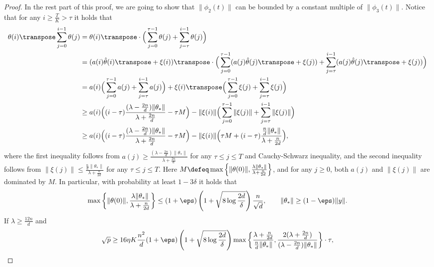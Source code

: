 \begin{proof}
    In the rest part of this proof, we are going to show that $\|\phi_{2}(t)\|$ can be bounded by a constant multiple of $\|\phi_{3}(t)\|$. Notice that for any $i\geq \frac{T}{K} > \tau$ it holds that 
    \begin{align*}
        \theta(i)\transpose\sum_{j=0}^{i-1} \theta(j) & = \theta(i)\transpose \cdot \Big( \sum_{j=0}^{\tau-1} \theta(j) + \sum_{j=\tau}^{i-1} \theta(j) \Big) \\
        & = (a(i)\hat\theta(i)\transpose + \xi(i))\transpose \cdot \Big( \sum_{j=0}^{\tau-1} (a(j)\hat\theta(j)\transpose + \xi(j)) + \sum_{j=\tau}^{i-1} (a(j)\hat\theta(j)\transpose + \xi(j)) \Big) \\
        & = a(i) \Big( \sum_{j=0}^{\tau-1} a(j) + \sum_{j=\tau}^{i-1} a(j) \Big) + \xi(i)\transpose \Big( \sum_{j=0}^{\tau-1} \xi(j) + \sum_{j=\tau}^{i-1} \xi(j) \Big) \\
        & \geq a(i) \Big( (i-\tau) \frac{(\lambda-\frac{2n}{d})\|\theta_*\|}{\lambda + \frac{2n}{d}} - \tau M \Big) - \|\xi(i)\| \Big( \sum_{j=0}^{\tau-1} \|\xi(j)\| + \sum_{j=\tau}^{i-1} \|\xi(j)\| \Big) \\
        & \geq a(i) \Big( (i-\tau) \frac{(\lambda-\frac{2n}{d})\|\theta_*\|}{\lambda + \frac{2n}{d}} - \tau M \Big) - \|\xi(i)\| \Big( \tau M + (i-\tau) \frac{\frac{n}{d}\|\theta_*\|}{\lambda + \frac{n}{2d}} \Big),
    \end{align*}
    where the first inequality follows from $a(j) \geq \frac{(\lambda-\frac{2n}{d})\|\theta_*\|}{\lambda + \frac{2n}{d}}$ for any $\tau\leq j\leq T$ and Cauchy-Schwarz inequality, and the second inequality follows from $\|\xi(j)\|\leq \frac{\frac{n}{d}\|\theta_*\|}{\lambda + \frac{n}{2d}}$ for any $\tau\leq j\leq T$. Here $M \defeq \max\left\{\|\theta(0)\|,\frac{\lambda\|\theta_*\|}{\lambda + \frac{n}{2d}}\right\}$, and for any $j\geq 0$, both $a(j)$ and $\|\xi(j)\|$ are dominated by $M$. In particular, with probability at least $1-3\delta$ it holds that 
    \begin{align*}
        \max\left\{\|\theta(0)\|,\frac{\lambda\|\theta_*\|}{\lambda + \frac{n}{2d}}\right\} \leq (1+\eps)\left(1 + \sqrt{8\log\frac{2d}{\delta}}\right)\frac{n}{\sqrt{d}}, \qquad \|\theta_*\| \geq (1-\eps)\|y\|.
    \end{align*}
    If $\lambda\geq \frac{12n}{d}$ and 
    \begin{align*}
        \sqrt{p} \geq 16\eta K\frac{n^2}{d}(1+\eps) \left(1 + \sqrt{8\log\frac{2d}{\delta}}\right) \max\left\{ \frac{\lambda + \frac{n}{2d}}{\frac{n}{d}\|\theta_*\|}, \frac{2(\lambda + \frac{2n}{d})}{(\lambda-\frac{2n}{d})\|\theta_*\|} \right\} \cdot \tau,

\end{align*}
\end{proof}
